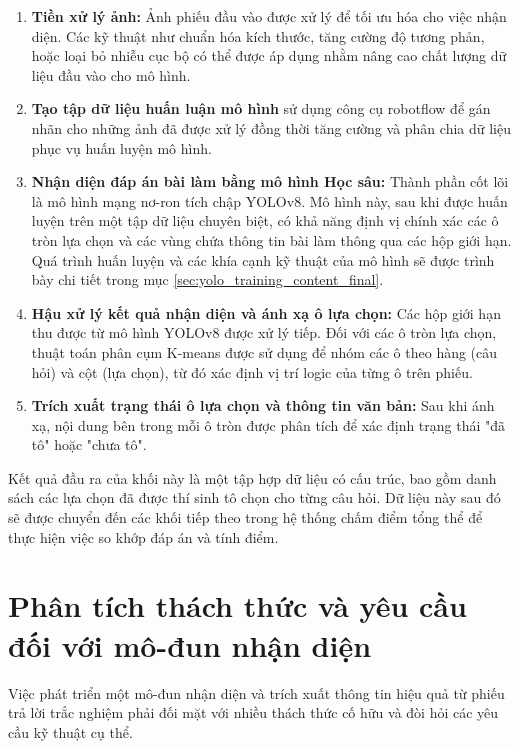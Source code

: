 \begin{enumerate}
    \item \textbf{Tiền xử lý ảnh:}
    Ảnh phiếu đầu vào được xử lý để tối ưu hóa cho việc nhận diện. Các kỹ thuật như chuẩn hóa kích thước, tăng cường độ tương phản, hoặc loại bỏ nhiễu cục bộ có thể được áp dụng nhằm nâng cao chất lượng dữ liệu đầu vào cho mô hình.
    \item \textbf{Tạo tập dữ liệu huấn luận mô hình } sử dụng công cụ robotflow để gán nhãn cho những ảnh đã được xử lý đồng thời tăng cường và phân chia dữ liệu phục vụ huấn luyện mô hình.

    \item \textbf{Nhận diện đáp án bài làm bằng mô hình Học sâu:}
    Thành phần cốt lõi là mô hình mạng nơ-ron tích chập YOLOv8. Mô hình này, sau khi được huấn luyện trên một tập dữ liệu chuyên biệt, có khả năng định vị chính xác các ô tròn lựa chọn và các vùng chứa thông tin bài làm thông qua các hộp giới hạn. Quá trình huấn luyện và các khía cạnh kỹ thuật của mô hình sẽ được trình bày chi tiết trong mục \ref{sec:yolo_training_content_final}.

    \item \textbf{Hậu xử lý kết quả nhận diện và ánh xạ ô lựa chọn:}
    Các hộp giới hạn thu được từ mô hình YOLOv8 được xử lý tiếp. Đối với các ô tròn lựa chọn, thuật toán phân cụm K-means được sử dụng để nhóm các ô theo hàng (câu hỏi) và cột (lựa chọn), từ đó xác định vị trí logic của từng ô trên phiếu.

    \item \textbf{Trích xuất trạng thái ô lựa chọn và thông tin văn bản:}
    Sau khi ánh xạ, nội dung bên trong mỗi ô tròn được phân tích để xác định trạng thái "đã tô" hoặc "chưa tô".
\end{enumerate}

Kết quả đầu ra của khối này là một tập hợp dữ liệu có cấu trúc, bao gồm danh sách các lựa chọn đã được thí sinh tô chọn cho từng câu hỏi. Dữ liệu này sau đó sẽ được chuyển đến các khối tiếp theo trong hệ thống chấm điểm tổng thể để thực hiện việc so khớp đáp án và tính điểm.
\section{Phân tích thách thức và yêu cầu đối với mô-đun nhận diện}
\label{sec:thach_thuc_yeu_cau_module}

Việc phát triển một mô-đun nhận diện và trích xuất thông tin hiệu quả từ phiếu trả lời trắc nghiệm phải đối mặt với nhiều thách thức cố hữu và đòi hỏi các yêu cầu kỹ thuật cụ thể.

